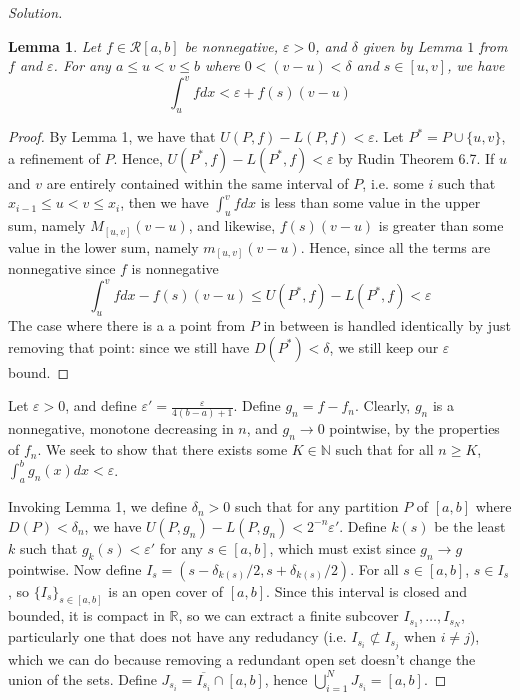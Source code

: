 \documentclass{article}
\newcommand{\N}{{\mathbb N}}
\newcommand{\R}{{\mathbb R}}
\newcommand{\ep}{{\varepsilon}}
\newtheorem{lemma}{Lemma}
\theoremstyle{remark}
\begin{document}
\begin{proof}[Solution]
	\begin{lemma}
		Let $f \in \mathcal{R}[a,b]$ be nonnegative, $\ep > 0$,
		and $\delta$ given by Lemma $1$ from $f$ and $\ep$.
		For any $a \leq u < v \leq b$ where $0 < (v-u) < \delta$
		and $s \in [u,v]$, we have
		\[
			\int_u^v fdx < \ep + f(s)(v-u)
		\]
	\end{lemma}
	\begin{proof}
		By Lemma 1, we have that $U(P,f) - L(P,f) < \ep$.
		Let $P^* = P \cup \{u,v\}$, a refinement of $P$.
		Hence, $U(P^*,f) - L(P^*,f) < \ep$ by Rudin Theorem 6.7.
		If $u$ and $v$ are entirely contained within the same interval of $P$,
		i.e. some $i$ such that $x_{i-1} \leq u < v \leq x_i$, then
		we have $\int_u^v fdx$ is less than some value in the upper sum,
		namely $M_{[u,v]}(v-u)$,
		and likewise, $f(s)(v-u)$ is greater than some value in the lower sum,
		namely $m_{[u,v]}(v-u)$.
		Hence, since all the terms are nonnegative since $f$ is nonnegative
		\[
			\int_u^v fdx - f(s)(v-u) \leq U(P^*,f) - L(P^*,f) < \ep
		\]
		The case where there is a a point from $P$ in between is handled
		identically by just removing that point:
		since we still have $D(P^*) < \delta$,
		we still keep our $\ep$ bound.
	\end{proof}

	Let $\ep > 0$, and define $\ep' = \frac{\ep}{4(b-a)+1}$.
	Define $g_n = f - f_n$.
	Clearly, $g_n$ is a nonnegative, monotone decreasing in $n$,
	and $g_n \to 0$ pointwise, by the properties of $f_n$.
	We seek to show that there exists some $K \in \N$ such that
	for all $n \geq K$, $\int_a^b g_n(x)dx < \ep$.

	Invoking Lemma 1, we define $\delta_n > 0$ such that
	for any partition $P$ of $[a,b]$ where $D(P) < \delta_n$,
	we have $U(P,g_n) - L(P,g_n) < 2^{-n}\ep'$.
	Define $k(s)$ be the least $k$ such that $g_k(s) < \ep'$
	for any $s \in [a,b]$,
	which must exist since $g_n \to g$ pointwise.
	Now define $I_s = (s - \delta_{k(s)}/2, s + \delta_{k(s)}/2)$.
	For all $s \in [a,b]$, $s \in I_s$,
	so $\{I_s\}_{s \in [a,b]}$ is an open cover of $[a,b]$.
	Since this interval is closed and bounded, it is compact in $\R$,
	so we can extract a finite subcover
	$I_{s_1},\dots,I_{s_N}$,
	particularly one that does not have any redudancy
	(i.e. $I_{s_i} \not\subset I_{s_j}$ when $i \neq j$),
	which we can do because removing a redundant open set doesn't
	change the union of the sets.
	Define $J_{s_i} = \overline{I_{s_i}} \cap [a,b]$,
	hence $\bigcup_{i=1}^N J_{s_i} = [a,b]$.


\end{proof}
\end{document}

